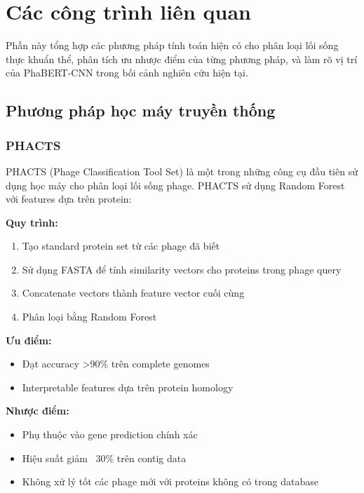 \section{Các công trình liên quan}
\label{sec:related_work}

Phần này tổng hợp các phương pháp tính toán hiện có cho phân loại lối sống thực khuẩn thể, phân tích ưu nhược điểm của từng phương pháp, và làm rõ vị trí của PhaBERT-CNN trong bối cảnh nghiên cứu hiện tại.

\subsection{Phương pháp học máy truyền thống}

\subsubsection{PHACTS}

PHACTS (Phage Classification Tool Set) \cite{mcnair2012phacts} là một trong những công cụ đầu tiên sử dụng học máy cho phân loại lối sống phage. PHACTS sử dụng Random Forest với features dựa trên protein:

\textbf{Quy trình:}
\begin{enumerate}
    \item Tạo standard protein set từ các phage đã biết
    \item Sử dụng FASTA để tính similarity vectors cho proteins trong phage query
    \item Concatenate vectors thành feature vector cuối cùng
    \item Phân loại bằng Random Forest
\end{enumerate}

\textbf{Ưu điểm:}
\begin{itemize}
    \item Đạt accuracy >90\% trên complete genomes
    \item Interpretable features dựa trên protein homology
\end{itemize}

\textbf{Nhược điểm:}
\begin{itemize}
    \item Phụ thuộc vào gene prediction chính xác
    \item Hiệu suất giảm ~30\% trên contig data \cite{wu2021deephage}
    \item Không xử lý tốt các phage mới với proteins không có trong database
\end{itemize}

